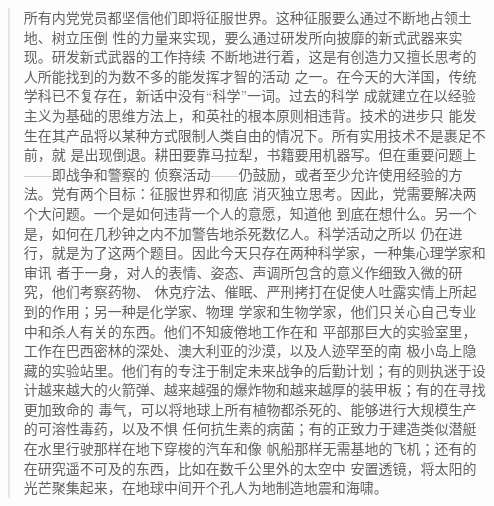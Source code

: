 \begin{paracol}{2}
\switchcolumn

\begin{quotation}
所有内党党员都坚信他们即将征服世界。这种征服要么通过不断地占领土地、树立压倒
性的力量来实现，要么通过研发所向披靡的新式武器来实现。研发新式武器的工作持续
不断地进行着，这是有创造力又擅长思考的人所能找到的为数不多的能发挥才智的活动
之一。在今天的大洋国，传统学科已不复存在，新话中没有``科学''一词。过去的科学
成就建立在以经验主义为基础的思维方法上，和英社的根本原则相违背。技术的进步只
能发生在其产品将以某种方式限制人类自由的情况下。所有实用技术不是裹足不前，就
是出现倒退。耕田要靠马拉犁，书籍要用机器写。但在重要问题上——即战争和警察的
侦察活动——仍鼓励，或者至少允许使用经验的方法。党有两个目标：征服世界和彻底
消灭独立思考。因此，党需要解决两个大问题。一个是如何违背一个人的意愿，知道他
到底在想什么。另一个是，如何在几秒钟之内不加警告地杀死数亿人。科学活动之所以
仍在进行，就是为了这两个题目。因此今天只存在两种科学家，一种集心理学家和审讯
者于一身，对人的表情、姿态、声调所包含的意义作细致入微的研究，他们考察药物、
休克疗法、催眠、严刑拷打在促使人吐露实情上所起到的作用；另一种是化学家、物理
学家和生物学家，他们只关心自己专业中和杀人有关的东西。他们不知疲倦地工作在和
平部那巨大的实验室里，工作在巴西密林的深处、澳大利亚的沙漠，以及人迹罕至的南
极小岛上隐藏的实验站里。他们有的专注于制定未来战争的后勤计划；有的则执迷于设
计越来越大的火箭弹、越来越强的爆炸物和越来越厚的装甲板；有的在寻找更加致命的
毒气，可以将地球上所有植物都杀死的、能够进行大规模生产的可溶性毒药，以及不惧
任何抗生素的病菌；有的正致力于建造类似潜艇在水里行驶那样在地下穿梭的汽车和像
帆船那样无需基地的飞机；还有的在研究遥不可及的东西，比如在数千公里外的太空中
安置透镜，将太阳的光芒聚集起来，在地球中间开个孔人为地制造地震和海啸。
\end{quotation}

\switchcolumn*


\end{paracol}
